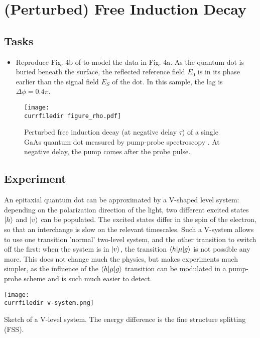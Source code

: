 \renewcommand{\lastmod}{May 1, 2020}


\chapter{(Perturbed) Free Induction Decay}



\section{Tasks}

\begin{itemize}
\item Reproduce Fig. 4b of \cite{Wolpert:2012hs} to model the data in Fig. 4a. As the quantum dot is buried beneath the surface, the reflected reference field $E_0$ is in its phase earlier than the signal field $E_S$ of the dot. In this sample, the lag is $\Delta \phi = 0.4 \pi$.
\end{itemize}

\begin{figure}
\centering
\texttt{[image: \\currfiledir figure\_rho.pdf]}
\caption{Perturbed free induction decay (at negative delay $\tau$) of a single GaAs quantum dot measured by pump-probe spectroscopy \citep{Wolpert:2012hs}. At negative delay, the pump comes after the probe pulse.}
\end{figure}

\section{Experiment}

An epitaxial quantum dot can be approximated by a V-shaped level system: depending on the polarization direction of the light, two different excited states $\ket{h}$ and $\ket{v}$
 can be populated. The excited states differ in the spin of the electron, so that an interchange is slow on the relevant timescales. Such a V-system allows to use one transition 'normal' two-level system, and the other transition to switch off the first: when the system is in $\ket{v}$, the transition $\braket{h | \mu | g}$ is not possible any more. This does not change much the physics, but makes experiments much simpler, as the influence of the  $\braket{h | \mu | g}$ transition can be modulated in a pump-probe scheme and is such much easier to detect.
 
\begin{marginfigure}
\texttt{[image: \\currfiledir v-system.png]}
\caption{Sketch of a V-level system. The energy difference is the fine structure splitting (FSS).}
\end{marginfigure}


